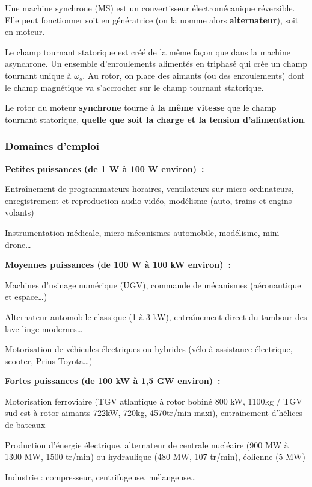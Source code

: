 Une machine synchrone (MS) est un convertisseur électromécanique réversible. Elle peut fonctionner soit en génératrice (on la nomme alors \textbf{alternateur}), soit en moteur.

Le champ tournant statorique est créé de la même façon que dans la machine asynchrone. Un ensemble d'enroulements alimentés en triphasé qui crée un champ tournant unique à \(\omega_{s}\). Au rotor, on place des aimants (ou des enroulements) dont le champ magnétique va s'accrocher sur le champ tournant statorique.

Le rotor du moteur \textbf{synchrone} tourne à \textbf{la même vitesse} que le champ tournant statorique, \textbf{quelle que soit la charge et la tension d'alimentation}.

\hypertarget{domaines-demploi}{%
\subsubsection{Domaines d'emploi}\label{domaines-demploi}}

\textbf{Petites puissances (de 1 W à 100 W environ)~:}

Entraînement de programmateurs horaires, ventilateurs sur micro-ordinateurs, enregistrement et reproduction audio-vidéo, modélisme (auto, trains et engins volants)

Instrumentation médicale, micro mécanismes automobile, modélisme, mini drone\ldots{}

\textbf{Moyennes puissances (de 100 W à 100 kW environ)~:}

Machines d'usinage numérique (UGV), commande de mécanismes (aéronautique et espace\ldots)

Alternateur automobile classique (1 à 3 kW), entraînement direct du tambour des lave-linge modernes\ldots{}

Motorisation de véhicules électriques ou hybrides (vélo à assistance électrique, scooter, Prius Toyota\ldots)

\textbf{Fortes puissances (de 100 kW à 1,5 GW environ)~:}

Motorisation ferroviaire (TGV atlantique à rotor bobiné 800 kW, 1100kg / TGV sud-est à rotor aimants 722kW, 720kg, 4570tr/min maxi), entrainement d'hélices de bateaux

Production d'énergie électrique, alternateur de centrale nucléaire (900 MW à 1300 MW, 1500 tr/min) ou hydraulique (480 MW, 107 tr/min), éolienne (5 MW)

Industrie : compresseur, centrifugeuse, mélangeuse\ldots{}


